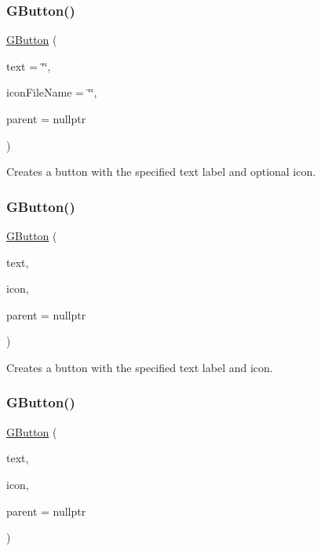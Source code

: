 \subsubsection{\texorpdfstring{G\+Button()}{GButton()}\hspace{0.1cm}{\footnotesize\ttfamily [1/3]}}
{\footnotesize\ttfamily \mbox{\hyperlink{classsgl_1_1GButton}{G\+Button}} (\begin{DoxyParamCaption}\item[{const std\+::string \&}]{text = {\ttfamily \char`\"{}\char`\"{}},  }\item[{const std\+::string \&}]{icon\+File\+Name = {\ttfamily \char`\"{}\char`\"{}},  }\item[{Q\+Widget $\ast$}]{parent = {\ttfamily nullptr} }\end{DoxyParamCaption})}



Creates a button with the specified text label and optional icon. 

\mbox{\label{classsgl_1_1GButton_aecb1d20fb4707a3121600de27d5b3307}} 
\subsubsection{\texorpdfstring{G\+Button()}{GButton()}\hspace{0.1cm}{\footnotesize\ttfamily [2/3]}}
{\footnotesize\ttfamily \mbox{\hyperlink{classsgl_1_1GButton}{G\+Button}} (\begin{DoxyParamCaption}\item[{const std\+::string \&}]{text,  }\item[{const Q\+Icon \&}]{icon,  }\item[{Q\+Widget $\ast$}]{parent = {\ttfamily nullptr} }\end{DoxyParamCaption})}



Creates a button with the specified text label and icon. 

\mbox{\label{classsgl_1_1GButton_a7bcc15aa469e535bb9030ba9a4c93116}} 
\subsubsection{\texorpdfstring{G\+Button()}{GButton()}\hspace{0.1cm}{\footnotesize\ttfamily [3/3]}}
{\footnotesize\ttfamily \mbox{\hyperlink{classsgl_1_1GButton}{G\+Button}} (\begin{DoxyParamCaption}\item[{const std\+::string \&}]{text,  }\item[{const Q\+Pixmap \&}]{icon,  }\item[{Q\+Widget $\ast$}]{parent = {\ttfamily nullptr} }\end{DoxyParamCaption})}



